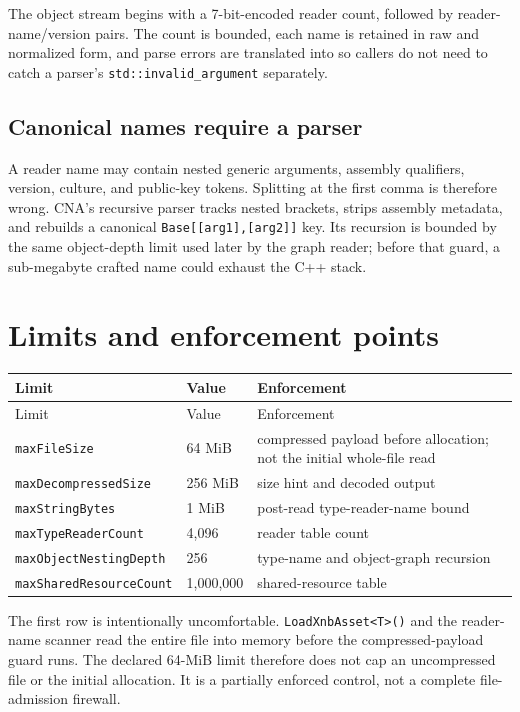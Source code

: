 The object stream begins with a 7-bit-encoded reader count, followed by reader-name/version
pairs.  The count is bounded, each name is retained in raw and normalized form, and parse errors
are translated into  so callers do not need to catch a parser's
\texttt{std::invalid\_argument} separately.

\subsection{Canonical names require a parser}
\label{sec:xnb-type-name-contract}

A reader name may contain nested generic arguments, assembly qualifiers, version, culture, and
public-key tokens.  Splitting at the first comma is therefore wrong.  CNA's recursive parser
tracks nested brackets, strips assembly metadata, and rebuilds a canonical
\texttt{Base[[arg1],[arg2]]} key.  Its recursion is bounded by the same object-depth limit used
later by the graph reader; before that guard, a sub-megabyte crafted name could exhaust the C++
stack.

\section{Limits and enforcement points}

\begin{longtable}{p{}p{}p{}}
\toprule
Limit & Value & Enforcement \\
\midrule
\endfirsthead
\toprule
Limit & Value & Enforcement \\
\midrule
\endhead
\texttt{maxFileSize} & 64 MiB & compressed payload before allocation; not the initial whole-file read \\
\texttt{maxDecompressedSize} & 256 MiB & size hint and decoded output \\
\texttt{maxStringBytes} & 1 MiB & post-read type-reader-name bound \\
\texttt{maxTypeReaderCount} & 4,096 & reader table count \\
\texttt{maxObjectNestingDepth} & 256 & type-name and object-graph recursion \\
\texttt{maxSharedResourceCount} & 1,000,000 & shared-resource table \\
\bottomrule
\end{longtable}

The first row is intentionally uncomfortable.  \texttt{LoadXnbAsset<T>()} and the reader-name
scanner read the entire file into memory before the compressed-payload guard runs.  The declared
64-MiB limit therefore does not cap an uncompressed file or the initial allocation.  It is a
partially enforced control, not a complete file-admission firewall.

